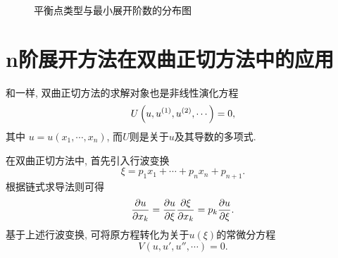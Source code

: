 \begin{figure}[htbp]
\centering
{}
\caption{平衡点类型与最小展开阶数的分布图}
\end{figure}

\section{n阶展开方法在双曲正切方法中的应用}\label{ch4sec5}
和一样, 双曲正切方法的求解对象也是非线性演化方程
\begin{equation}
    U\left(u,u^{(1)},u^{(2)},\cdots\right)=0,
\end{equation}
其中 $u=u(x_1,\cdots,x_n)$, 而$U$则是关于$u$及其导数的多项式. 

在双曲正切方法中, 首先引入行波变换 
\begin{equation}
    \xi = p_1 x_1 +\cdots + p_n x_n + p_{n+1}.  \label{tanh-tw}
\end{equation}
根据链式求导法则可得
\begin{equation}
    \frac{\partial u}{\partial x_k}=\frac{\partial u}{\partial \xi}\frac{\partial \xi}{\partial x_k}=p_k\frac{\partial u}{\partial \xi}.
\end{equation}
基于上述行波变换, 可将原方程转化为关于$u(\xi)$的常微分方程
\begin{equation}
    V(u,u',u'',\cdots)=0. \label{odeq}
\end{equation}

